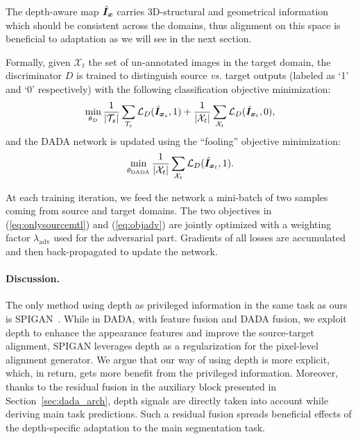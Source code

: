\documentclass[10pt,twocolumn,letterpaper]{article}
\newcommand{\src}[1]{#1_s}
\newcommand{\trg}[1]{#1_t}
\newcommand{\cX}{\mathcal{X}}
\newcommand{\cT}{\mathcal{T}}
\newcommand{\adv}{\mathrm{adv}}
\begin{document}
The depth-aware map $\hat{\bm{I}}_{\bm{x}}$ carries 3D-structural and geometrical information which should be consistent across the domains, thus alignment on this space is beneficial to adaptation as we will see in the next section.

Formally, given $\trg{\mathcal{X}}$ the set of un-annotated images in the target domain, the discriminator $D$ is trained to distinguish source \textit{vs.} target outputs (labeled as `1' and `0' respectively) with the following classification objective minimization:
\begin{equation}\label{eq:objdis}
\min_{\theta_D} \frac{1}{|\cT_s|}\sum_{\cT_s}\mathcal{L}_{D}(\hat{\mm{I}}_{\src{\mm x}}, 1) + \frac{1}{|\cX_t|}\sum_{\trg{\mathcal{X}}}\mathcal{L}_{D}(\hat{\mm{I}}_{\trg{\mm x}}, 0),
\end{equation}
and the DADA network is updated using the ``fooling'' objective minimization:
\begin{equation}\label{eq:objadv}
\min_{\theta_{\mathrm{DADA}}} \frac{1}{|\cX_t|}\sum_{\trg{\mathcal{X}}} \mathcal{L}_{D}(\hat{\mm{I}}_{\trg{\mm x}}, 1).
\end{equation}

At each training iteration, we feed the network a mini-batch of two samples coming from source and target domains.
The two objectives in (\ref{eq:onlysourcemtl}) and (\ref{eq:objadv}) are jointly optimized with a weighting factor $\lambda_{\adv}$ used for the adversarial part.
Gradients of all losses are accumulated and then back-propagated to update the network.

\vspace{-0.3cm}\paragraph{Discussion.} The only method using depth as privileged information in the same task as ours is SPIGAN~\cite{lee2018spigan}.
While in DADA, with feature fusion and DADA fusion, we exploit depth to enhance the appearance features and improve the source-target alignment, SPIGAN leverages depth as a regularization for the pixel-level alignment generator.
We argue that our way of using depth is more explicit, which, in return, gets more benefit from the privileged information.
Moreover, thanks to the residual fusion in the auxiliary block presented in Section~\ref{sec:dada_arch}, depth signals are directly taken into account while deriving main task predictions.
Such a residual fusion spreads beneficial effects of the depth-specific adaptation to the main segmentation task. 	
\end{document}
